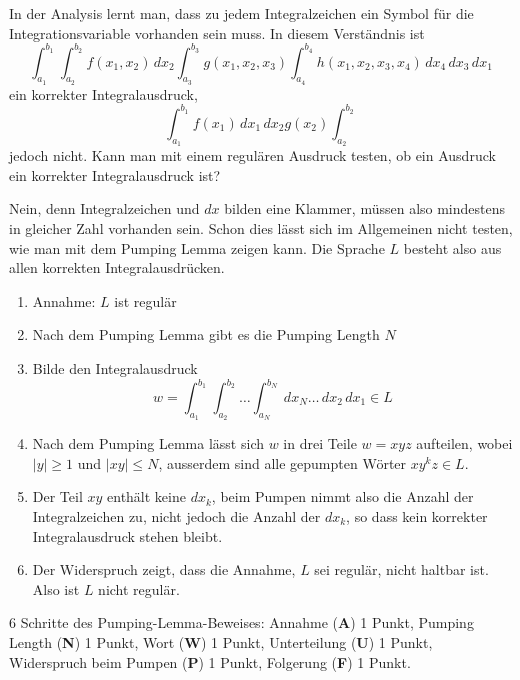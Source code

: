 In der Analysis lernt man, dass zu jedem Integralzeichen ein 
Symbol für die Integrationsvariable vorhanden sein muss.
In diesem Verständnis ist
\[
\int_{a_1}^{b_1}
\int_{a_2}^{b_2}
f(x_1,x_2)
\,dx_2
\int_{a_3}^{b_3}
g(x_1,x_2,x_3)
\int_{a_4}^{b_4}
h(x_1,x_2,x_3,x_4)
\,dx_4
\,dx_3
\,dx_1
\]
ein korrekter Integralausdruck,
\[
\int_{a_1}^{b_1}
f(x_1)\,dx_1\,dx_2 g(x_2)
\int_{a_2}^{b_2}
\]
jedoch nicht.
Kann man mit einem regulären Ausdruck testen, ob ein Ausdruck ein korrekter
Integralausdruck ist?


\begin{loesung}
Nein, denn Integralzeichen und $dx$ bilden eine Klammer, müssen also 
mindestens in gleicher Zahl vorhanden sein.
Schon dies lässt sich im Allgemeinen nicht testen, wie man mit dem 
Pumping Lemma zeigen kann.
Die Sprache $L$ besteht also aus allen korrekten Integralausdrücken.
\begin{enumerate}
\item
Annahme: $L$ ist regulär
\item
Nach dem Pumping Lemma gibt es die Pumping Length $N$
\item
Bilde den Integralausdruck
\[
w=
\int_{a_1}^{b_1}
\int_{a_2}^{b_2}
\dots
\int_{a_N}^{b_N}
\,dx_N
\dots
\,dx_2
\,dx_1
\in L
\]
\item
Nach dem Pumping Lemma lässt sich $w$ in drei Teile $w=xyz$ aufteilen, wobei
$|y|\ge 1$ und $|xy|\le N$, ausserdem sind alle gepumpten Wörter $xy^kz\in L$.
\item
Der Teil $xy$ enthält keine $dx_k$, beim Pumpen nimmt also die Anzahl
der Integralzeichen zu, nicht jedoch die Anzahl der $dx_k$, so dass
kein korrekter Integralausdruck stehen bleibt.
\item
Der Widerspruch zeigt, dass die Annahme, $L$ sei regulär, nicht haltbar ist.
Also ist $L$ nicht regulär.
\qedhere
\end{enumerate}
\end{loesung}

\begin{bewertung}
6 Schritte des Pumping-Lemma-Beweises:
Annahme ({\bf A}) 1 Punkt,
Pumping Length ({\bf N}) 1 Punkt,
Wort ({\bf W}) 1 Punkt,
Unterteilung ({\bf U}) 1 Punkt,
Widerspruch beim Pumpen ({\bf P}) 1 Punkt,
Folgerung ({\bf F}) 1 Punkt.
\end{bewertung}

